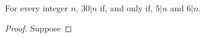 
\begin{theorem}
  For every integer $n$, $30|n$ if, and only if, $5|n$ and $6|n$.
\end{theorem}

\begin{proof}
  Suppose
\end{proof}
